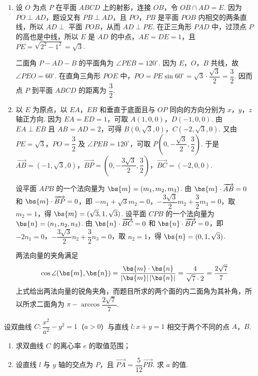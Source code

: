 \begin{solution}
\begin{enumerate}
\item 设 \(O\) 为点 \(P\) 在平面 \(ABCD\) 上的射影，连接 \(OB\)，令 \(OB\cap AD=E\). 因为 \(PO\perp AD\)，题设又有 \(PB\perp AD\)，且 \(PO\)，\(PB\) 是平面 \(POB\) 内相交的两条直线，所以 \(AD\perp\) 平面 \(POB\)，从而 \(AD\perp PE\). 在正三角形 \(PAD\) 中，过顶点 \(P\) 的高也是中线，所以 \(E\) 是 \(AD\) 的中点，\(AE=DE=1\)，且 \(PE=\sqrt{2^2-1^2}=\sqrt3\).

二面角 \(P-AD-B\) 的平面角为 \(\angle PEB=120^{\circ}\). 因为 \(E\)，\(O\)，\(B\) 共线，故 \(\angle PEO=60^{\circ}\). 在直角三角形 \(POE\) 中，\(PO=PE\sin60^{\circ}=\sqrt3\cdot\dfrac{\sqrt3}{2}=\dfrac32\). 因而点 \(P\) 到平面 \(ABCD\) 的距离为 \(\dfrac32\).
\item 以 \(E\) 为原点，以 \(EA\)，\(EB\) 和垂直于底面且与 \(OP\) 同向的方向分别为 \(x\)，\(y\)，\(z\) 轴正方向. 因为 \(EA=ED=1\)，可取 \(A(1,0,0)\)，\(D(-1,0,0)\). 由 \(EA\perp EB\) 且 \(AB=AD=2\)，可得 \(B(0,\sqrt3,0)\)，\(C(-2,\sqrt3,0)\). 又由 \(PE=\sqrt3\)，\(PO=\dfrac32\) 及 \(\angle PEB=120^{\circ}\)，可取 \(P\left(0,-\dfrac{\sqrt3}{2},\dfrac32\right)\).
于是 \(\overrightarrow{AB}=(-1,\sqrt3,0)\)，\(\overrightarrow{BP}=\left(0,-\dfrac{3\sqrt3}{2},\dfrac32\right)\)，\(\overrightarrow{BC}=(-2,0,0)\).

设平面 \(APB\) 的一个法向量为 \(\bs{m}=(m_1,m_2,m_3)\). 由 \(\bs{m}\cdot\overrightarrow{AB}=0\) 和 \(\bs{m}\cdot\overrightarrow{BP}=0\)，即 \(-m_1+\sqrt3m_2=0\)，\(-\dfrac{3\sqrt3}{2}m_2+\dfrac32m_3=0\)，取 \(m_2=1\)，得 \(\bs{m}=(\sqrt3,1,\sqrt3)\). 设平面 \(CPB\) 的一个法向量为 \(\bs{n}=(n_1,n_2,n_3)\). 由 \(\bs{n}\cdot\overrightarrow{BC}=0\) 和 \(\bs{n}\cdot\overrightarrow{BP}=0\)，即 \(-2n_1=0\)，\(-\dfrac{3\sqrt3}{2}n_2+\dfrac32n_3=0\)，取 \(n_2=1\)，得 \(\bs{n}=(0,1,\sqrt3)\).

两法向量的夹角满足
\[
\cos\angle(\bs{m},\bs{n})=\frac{\bs{m}\cdot\bs{n}}{|\bs{m}|\,|\bs{n}|}=\frac4{\sqrt7\cdot2}=\frac{2\sqrt7}{7}
\]
上式给出两法向量的锐角夹角，而题目所求的两个面的内二面角为其补角，所以所求二面角为 \(\pi-\arccos\dfrac{2\sqrt7}{7}\).
\end{enumerate}
\end{solution}

\begin{problem}
设双曲线 \(C:\dfrac{x^2}{a^2}-y^2=1\)（\(a>0\)）与直线 \(l:x+y=1\) 相交于两个不同的点 \(A\)，\(B\).

\begin{enumerate}
\item 求双曲线 \(C\) 的离心率 \(e\) 的取值范围；
\item 设直线 \(l\) 与 \(y\) 轴的交点为 \(P\)，且 \(\overrightarrow{PA}=\dfrac5{12}\overrightarrow{PB}\). 求 \(a\) 的值.
\end{enumerate}
\end{problem}

